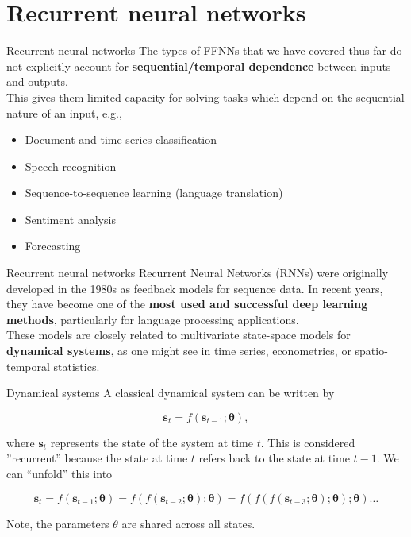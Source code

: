 \documentclass{beamer}
\begin{document}
\section{Recurrent neural networks}
\begin{frame}{Recurrent neural networks}
The types of FFNNs that we have covered thus far do not explicitly account for \textbf{sequential/temporal dependence} between inputs and outputs. \\
This gives them limited capacity for solving tasks which depend on the sequential nature of an input, e.g.,
\begin{itemize}
\item Document and time-series classification
\item Speech recognition
\item Sequence-to-sequence learning (language translation)
\item Sentiment analysis
\item Forecasting
\end{itemize}

\end{frame}
\begin{frame}{Recurrent neural networks}
Recurrent Neural Networks (RNNs) were originally developed in the 1980s as feedback models for sequence data. In recent years, they have become one of the \textbf{most used and successful deep learning methods}, particularly for language processing applications.\\
These models are closely related to multivariate state-space models for \textbf{dynamical systems}, as one might see in time series, econometrics, or spatio-temporal statistics.

\end{frame}
\begin{frame}{Dynamical systems}
A classical dynamical system can be written by

$$
\mathbf{s}_{t}=f\left(\mathbf{s}_{t-1} ; \boldsymbol{\theta}\right),
$$

where $\mathbf{s}_{t}$ represents the state of the system at time $t$. This is considered ''recurrent'' because the state at time $t$ refers back to the state at time $t-1$. We can ``unfold'' this into

$$
\mathbf{s}_{t}=f\left(\mathbf{s}_{t-1} ; \boldsymbol{\theta}\right)=f\left(f\left(\mathbf{s}_{t-2} ; \boldsymbol{\theta}\right) ; \boldsymbol{\theta}\right)=f\left(f\left(f\left(\mathbf{s}_{t-3} ; \boldsymbol{\theta}\right) ; \boldsymbol{\theta}\right) ; \boldsymbol{\theta}\right) \ldots
$$

Note, the parameters $\theta$ are shared across all states. 
\end{frame}
\end{document}
